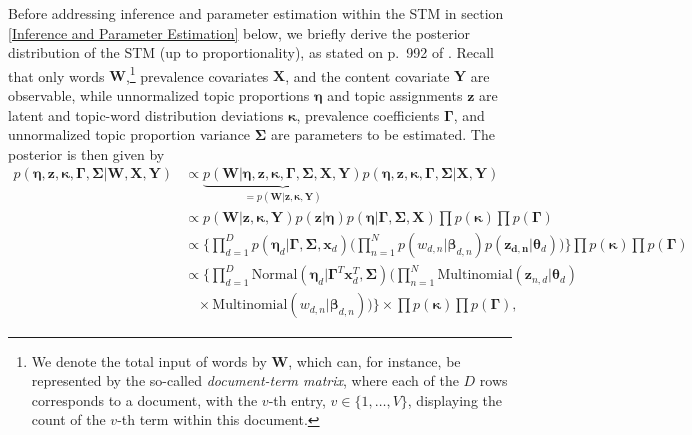 Before addressing inference and parameter estimation within the STM in section \ref{Inference and Parameter Estimation} below, we briefly derive the posterior distribution of the STM (up to proportionality), as stated on p.\ 992 of \cite{roberts2016model}. Recall that only words $\boldsymbol{W}$,\footnote{We denote the total input of words by $\boldsymbol{W}$, which can, for instance, be represented by the so-called \textit{document-term matrix}, where each of the $D$ rows corresponds to a document, with the $v$-th entry, $v \in \{1, \dots, V\}$, displaying the count of the $v$-th term within this document.} prevalence covariates $\boldsymbol{X}$, and the content covariate $\boldsymbol{Y}$ are observable, while unnormalized topic proportions $\boldsymbol{\eta}$ and topic assignments $\boldsymbol{z}$ are latent and topic-word distribution deviations $\boldsymbol{\kappa}$, prevalence coefficients $\boldsymbol{\Gamma}$, and unnormalized topic proportion variance $\boldsymbol{\Sigma}$ are parameters to be estimated. The posterior is then given by
\begin{align*}
p(\boldsymbol{\eta}, \boldsymbol{z}, \boldsymbol{\kappa}, \boldsymbol{\Gamma}, \boldsymbol{\Sigma} | \boldsymbol{W}, \boldsymbol{X}, \boldsymbol{Y}) & \propto \underbrace{p(\boldsymbol{W} | \boldsymbol{\eta}, \boldsymbol{z}, \boldsymbol{\kappa}, \boldsymbol{\Gamma}, \boldsymbol{\Sigma}, \boldsymbol{X}, \boldsymbol{Y})}_{=p(\boldsymbol{W} | \boldsymbol{z}, \boldsymbol{\kappa}, \boldsymbol{Y})} p(\boldsymbol{\eta}, \boldsymbol{z}, \boldsymbol{\kappa}, \boldsymbol{\Gamma}, \boldsymbol{\Sigma} | \boldsymbol{X}, \boldsymbol{Y}) \\
& \propto p(\boldsymbol{W} | \boldsymbol{z}, \boldsymbol{\kappa}, \boldsymbol{Y}) p(\boldsymbol{z} | \boldsymbol{\eta}) p(\boldsymbol{\eta} | \boldsymbol{\Gamma}, \boldsymbol{\Sigma}, \boldsymbol{X}) \prod p(\boldsymbol{\kappa}) \prod p(\boldsymbol{\Gamma}) \\
& \propto \Big\{ \prod_{d=1}^{D} p(\boldsymbol{\eta}_d | \boldsymbol{\Gamma}, \boldsymbol{\Sigma}, \boldsymbol{x}_d) \Big( \prod_{n=1}^{N} p(w_{d,n} | \boldsymbol{\beta}_{d, n}) p(\boldsymbol{z_{d,n}} | \boldsymbol{\theta}_d) \Big) \Big\} \prod p(\boldsymbol{\kappa}) \prod p(\boldsymbol{\Gamma}) \\
& \propto \Big\{ \prod_{d=1}^{D} \text{Normal}(\boldsymbol{\eta}_d | \boldsymbol{\Gamma}^T\boldsymbol{x}_d^T, \boldsymbol{\Sigma}) \Big( \prod_{n=1}^{N} \text{Multinomial}(\boldsymbol{z}_{n,d}| \boldsymbol{\theta}_d) \\
& \ \ \ \ \times \text{Multinomial}(w_{d,n} | \boldsymbol{\beta}_{d,n}) \Big) \Big\} \times \prod p(\boldsymbol{\kappa}) \prod p(\boldsymbol{\Gamma}),
\end{align*}
